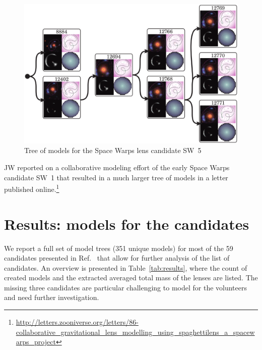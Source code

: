 \documentclass{ws-procs975x65}
\newcommand{\sw}{Space Warps\xspace}
\newcommand{\SW}[1]{SW~#1\xspace}
\newcommand{\icite}[1]{Ref.~\refcite{#1}}  %
\newcommand{\tabref}[1]{Table~\ref{tab:#1}}
\begin{document}
\begin{figure}
  \centering
  \includegraphics[width=\columnwidth]{modeltree}
  \caption{
    Tree of models for the \sw lens candidate \SW{5}
  }
  \label{fig:tree}
\end{figure}


JW reported on a collaborative modeling effort of the early \sw candidate \SW{1} that resulted in a much larger tree of models in a letter published online.\footnote{\url{http://letters.zooniverse.org/letters/86-collaborative_gravitational_lens_modelling_using_spaghettilens_a_spacewarps_project}}


\section{Results: models for the candidates}

We report a full set of model trees (351 unique models) for most of the 59 candidates presented in \icite{sw2} that allow for further analysis of the list of candidates.
An overview is presented in \tabref{results}, where the count of created models and the extracted averaged total mass of the lenses are listed.
The missing three candidates are particular challenging to model for the volunteers and need further investigation.
\end{document}
